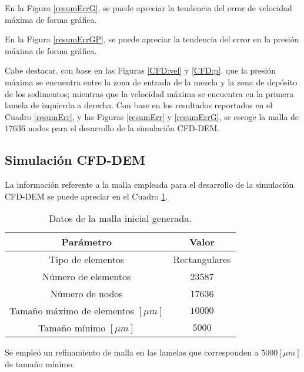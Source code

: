En la Figura \ref{resumErrG}, se puede apreciar la tendencia del error de velocidad m\'axima de forma gr\'afica.



\noindent
\justify

En la Figura \ref{resumErrGP}, se puede apreciar la tendencia del error en la presi\'on m\'axima de forma gr\'afica.



\noindent
\justify

Cabe destacar, con base en las Figuras \ref{CFD:vel} y \ref{CFD:p}, que la presi\'on m\'axima se encuentra entre la zona de entrada de la mezcla y la zona de dep\'osito de los sedimentos; mientras que la velocidad m\'axima se encuentra en la primera lamela de izquierda a derecha. Con base en los resultados reportados en el Cuadro \ref{resumErr}, y las Figuras \ref{resumErr} y \ref{resumErrG}, se escoge la malla de $17636$ nodos para el desarrollo de la simulaci\'on CFD-DEM.

\subsection{Simulaci\'on CFD-DEM}

\noindent
\justify

La informaci\'on referente a la malla empleada para el desarrollo de la simulaci\'on CFD-DEM se puede apreciar en el Cuadro \ref{mallaF}.

\begin{table}[h!]
	\centering
	\begin{tabular}{|c|c|}
		\hline
		\textbf{Par\'ametro} & \textbf{Valor} \\ \hline
		Tipo de elementos & Rectangulares \\ \hline
		N\'umero de elementos & 23587 \\ \hline
		N\'umero de nodos & 17636 \\ \hline
		Tama\~no m\'aximo de elementos $[\mu m]$ & $10000$ \\ \hline
		Tama\~no m\'inimo $[\mu m]$ & $5000$ \\ \hline	
	\end{tabular}
	\caption{Datos de la malla inicial generada.}
	\label{mallaF}
\end{table}

\noindent
\justify

Se emple\'o un refinamiento de malla en las lamelas que corresponden a $5000 [\mu m]$ de tama\~no m\'inimo. 

